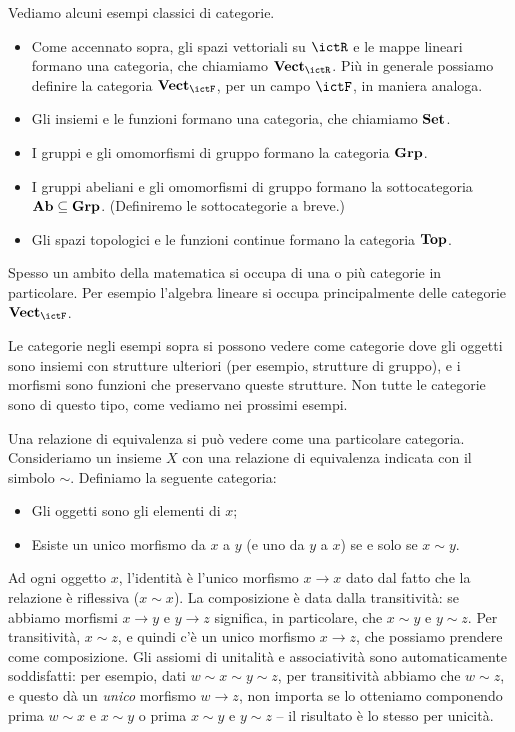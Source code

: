 \begin{examples} 
 Vediamo alcuni esempi classici di categorie. 
 \begin{itemize}
  \item Come accennato sopra, gli spazi vettoriali su $\ictR$ e le mappe lineari formano una categoria, che chiamiamo $\ctVect_\ictR$. Più in generale possiamo definire la categoria $\ctVect_\ictF$, per un campo $\ictF$, in maniera analoga.
  \item Gli insiemi e le funzioni formano una categoria, che chiamiamo $\mathbf{Set}$.
  \item I gruppi e gli omomorfismi di gruppo formano la categoria $\mathbf{Grp}$.
  \item I gruppi abeliani e gli omomorfismi di gruppo formano la sottocategoria $\mathbf{Ab}\subseteq\mathbf{Grp}$. (Definiremo le sottocategorie a breve.)
  \item Gli spazi topologici e le funzioni continue formano la categoria $\mathbf{Top}$. 
 \end{itemize}
Spesso un ambito della matematica si occupa di una o più categorie in particolare. Per esempio l'algebra lineare si occupa principalmente delle categorie $\ctVect_\ictF$.
\end{examples}

Le categorie negli esempi sopra si possono vedere come categorie dove gli oggetti sono insiemi con strutture ulteriori (per esempio, strutture di gruppo), e i morfismi sono funzioni che preservano queste strutture. Non tutte le categorie sono di questo tipo, come vediamo nei prossimi esempi. 

\begin{example}
 Una relazione di equivalenza si può vedere come una particolare categoria. Consideriamo un insieme $X$ con una relazione di equivalenza indicata con il simbolo $\sim$.
 Definiamo la seguente categoria:
 \begin{itemize}
  \item Gli oggetti sono gli elementi di $x$;
  \item Esiste un unico morfismo da $x$ a $y$ (e uno da $y$ a $x$) se e solo se $x\sim y$. 
 \end{itemize}
 Ad ogni oggetto $x$, l'identità è l'unico morfismo $x\to x$ dato dal fatto che la relazione è riflessiva ($x\sim x$). 
 La composizione è data dalla transitività: se abbiamo morfismi $x\to y$ e $y\to z$ significa, in particolare, che $x\sim y$ e $y\sim z$. Per transitività, $x\sim z$, e quindi c'è un unico morfismo $x\to z$, che possiamo prendere come composizione. 
 Gli assiomi di unitalità e associatività sono automaticamente soddisfatti: per esempio, dati $w\sim x\sim y\sim z$, per transitività abbiamo che $w\sim z$, e questo dà un \emph{unico} morfismo $w\to z$, non importa se lo otteniamo componendo prima $w\sim x$ e $x\sim y$ o prima $x\sim y$ e $y\sim z$ -- il risultato è lo stesso per unicità. 
\end{example}

